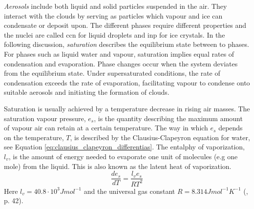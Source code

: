 \textit{Aerosols} include both liquid and solid particles suspended in the air. They interact with the clouds by serving as particles which vapour and ice can condensate or deposit upon. The different phases require different properties and the nuclei are called \acrfull{ccn} for liquid droplets and \acrfull{inp} for ice crystals. 
In the following discussion, \textit{saturation} describes the equilibrium state between to phases. %
For phases such as liquid water and vapour, saturation implies equal rates of condensation and evaporation. Phase changes occur when the system deviates from the equilibrium state. Under supersaturated conditions, the rate of condensation exceeds the rate of evaporation, facilitating vapour to condense onto suitable aerosols and initiating the formation of clouds. 

Saturation is usually achieved by a temperature decrease in rising air masses. The saturation vapour pressure, $e_s$, is the quantity describing the maximum amount of vapour air can retain at a certain temperature. The way in which $e_s$ depends on the temperature, $T$, is described by the Clausius-Clapeyron equation for water, see Equation \eqref{eq:clausius_clapeyron_differentias}. The entalphy of vaporization, $l_v$, is the amount of energy needed to evaporate one unit of molecules (e.g one mole) from the liquid. This is also known as the latent heat of vaporization. 
\begin{equation} \label{eq:clausius_clapeyron_differentias}
    \frac{de_s}{dT} = \frac{l_v e_s}{R T^2}
\end{equation}
Here $l_v = 40.8 \cdot 10^3 J mol^{-1}$ and the universal gas constant $R= 8.314 J mol^{-1} K^{-1}$ (\cite{cloud_phys_book_johanne}, p. 42). 

